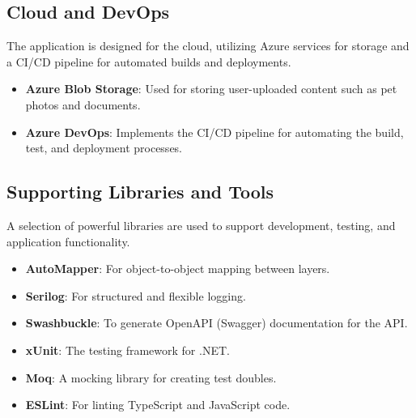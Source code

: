 \documentclass[12pt,a4paper]{article}
\begin{document}
\subsection*{Cloud and DevOps}

The application is designed for the cloud, utilizing Azure services for storage and a CI/CD pipeline for automated builds and deployments.

\begin{tcolorbox}[colback=lightgray, colframe=primaryblue, title=Cloud Infrastructure]
    \begin{itemize}[leftmargin=*]
        \item \textbf{Azure Blob Storage}: Used for storing user-uploaded content such as pet photos and documents.
        \item \textbf{Azure DevOps}: Implements the CI/CD pipeline for automating the build, test, and deployment processes.
    \end{itemize}
\end{tcolorbox}

\subsection*{Supporting Libraries and Tools}

A selection of powerful libraries are used to support development, testing, and application functionality.

\begin{tcolorbox}[colback=lightgray, colframe=darkgray, title=Development and Tooling]
    \begin{itemize}[leftmargin=*]
        \item \textbf{AutoMapper}: For object-to-object mapping between layers.
        \item \textbf{Serilog}: For structured and flexible logging.
        \item \textbf{Swashbuckle}: To generate OpenAPI (Swagger) documentation for the API.
        \item \textbf{xUnit}: The testing framework for .NET.
        \item \textbf{Moq}: A mocking library for creating test doubles.
        \item \textbf{ESLint}: For linting TypeScript and JavaScript code.
    \end{itemize}
\end{tcolorbox}
\end{document}
